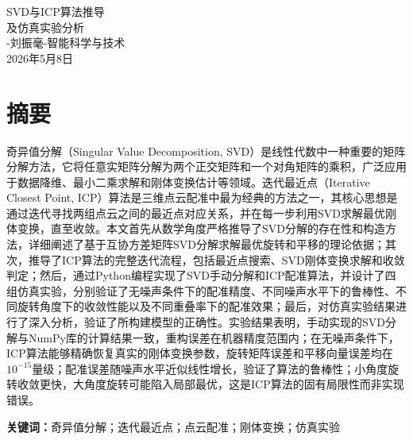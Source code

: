 \documentclass[a4paper,12pt]{ctexrep}
\begin{document}
\begin{titlepage}
\centering
\vspace*{2cm}
{\heiti\fontsize{26pt}{26pt}\selectfont SVD与ICP算法推导\\[0.5em]及仿真实验分析}\\[3cm]
{\songti\fontsize{16pt}{16pt}-刘振毫-智能科学与技术}\\[4cm]

{\songti\fontsize{14pt}{14pt}\selectfont 2026年5月8日}
\vfill
\end{titlepage}

\chapter*{摘\quad 要}

奇异值分解（Singular Value Decomposition, SVD）是线性代数中一种重要的矩阵分解方法，它将任意实矩阵分解为两个正交矩阵和一个对角矩阵的乘积，广泛应用于数据降维、最小二乘求解和刚体变换估计等领域。迭代最近点（Iterative Closest Point, ICP）算法是三维点云配准中最为经典的方法之一，其核心思想是通过迭代寻找两组点云之间的最近点对应关系，并在每一步利用SVD求解最优刚体变换，直至收敛。本文首先从数学角度严格推导了SVD分解的存在性和构造方法，详细阐述了基于互协方差矩阵SVD分解求解最优旋转和平移的理论依据；其次，推导了ICP算法的完整迭代流程，包括最近点搜索、SVD刚体变换求解和收敛判定；然后，通过Python编程实现了SVD手动分解和ICP配准算法，并设计了四组仿真实验，分别验证了无噪声条件下的配准精度、不同噪声水平下的鲁棒性、不同旋转角度下的收敛性能以及不同重叠率下的配准效果；最后，对仿真实验结果进行了深入分析，验证了所构建模型的正确性。实验结果表明，手动实现的SVD分解与NumPy库的计算结果一致，重构误差在机器精度范围内；在无噪声条件下，ICP算法能够精确恢复真实的刚体变换参数，旋转矩阵误差和平移向量误差均在$10^{-15}$量级；配准误差随噪声水平近似线性增长，验证了算法的鲁棒性；小角度旋转收敛更快，大角度旋转可能陷入局部最优，这是ICP算法的固有局限性而非实现错误。

\vspace{1em}
\noindent\textbf{关键词：}奇异值分解；迭代最近点；点云配准；刚体变换；仿真实验

\end{document}
